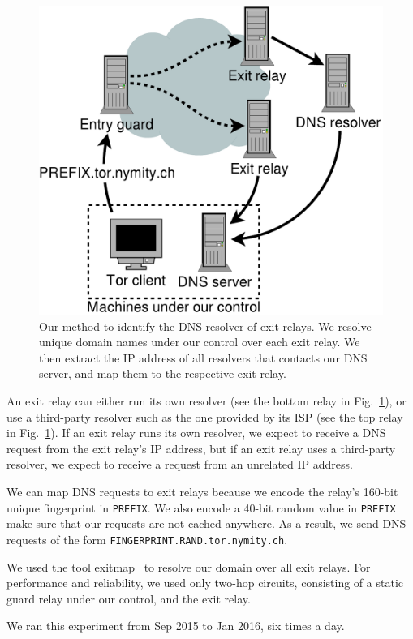 \begin{figure}[t]
	\centering
	\includegraphics[width=0.8\linewidth]{figures/dns-resolver-enumeration.pdf}
	\caption{Our method to identify the DNS resolver of exit relays.  We resolve
	unique domain names under our control over each exit relay.  We then extract
	the IP address of all resolvers that contacts our DNS server, and map them
	to the respective exit relay.}
	\label{fig:dnsenum}
\end{figure}

An exit relay can either run its own resolver (see the bottom relay in
Fig.~\ref{fig:dnsenum}), or use a third-party resolver such as the one provided
by its ISP (see the top relay in Fig.~\ref{fig:dnsenum}).  If an exit relay runs
its own resolver, we expect to receive a DNS request from the exit relay's IP
address, but if an exit relay uses a third-party resolver, we expect to receive
a request from an unrelated IP address.

We can map DNS requests to exit relays because we encode the relay's 160-bit
unique fingerprint in \texttt{PREFIX}.  We also encode a 40-bit random value in
\texttt{PREFIX} make sure that our requests are not cached anywhere.  As a
result, we send DNS requests of the form
\texttt{FINGERPRINT.RAND.tor.nymity.ch}.

We used the tool exitmap~\cite{Winter2014b} to resolve our domain over all exit
relays.  For performance and reliability, we used only two-hop circuits,
consisting of a static guard relay under our control, and the exit relay.

We ran this experiment from Sep 2015 to Jan 2016, six times a day.

